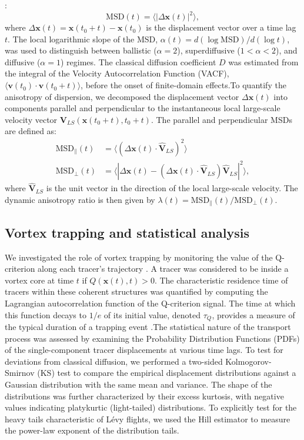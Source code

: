 \documentclass[]{article}
\begin{document}
\citep{katayama2025notetwopointmeansquare}:\begin{equation}\text{MSD}(t) = \langle |\Delta\mathbf{x}(t)|^2 \rangle,\end{equation}where $\Delta\mathbf{x}(t) = \mathbf{x}(t_0+t) - \mathbf{x}(t_0)$ is the displacement vector over a time lag $t$. The local logarithmic slope of the MSD, $\alpha(t) = d(\log \text{MSD}) / d(\log t)$, was used to distinguish between ballistic ($\alpha=2$), superdiffusive ($1 < \alpha < 2$), and diffusive ($\alpha=1$) regimes. The classical diffusion coefficient $D$ was estimated from the integral of the Velocity Autocorrelation Function (VACF), $\langle \mathbf{v}(t_0) \cdot \mathbf{v}(t_0+t) \rangle$, before the onset of finite-domain effects.To quantify the anisotropy of dispersion, we decomposed the displacement vector $\Delta\mathbf{x}(t)$ into components parallel and perpendicular to the instantaneous local large-scale velocity vector $\mathbf{V}_{LS}(\mathbf{x}(t_0+t), t_0+t)$. The parallel and perpendicular MSDs are defined as:\begin{align}\text{MSD}_{\parallel}(t) &= \langle (\Delta\mathbf{x}(t) \cdot \hat{\mathbf{V}}_{LS})^2 \rangle \\\text{MSD}_{\perp}(t) &= \langle |\Delta\mathbf{x}(t) - (\Delta\mathbf{x}(t) \cdot \hat{\mathbf{V}}_{LS}) \hat{\mathbf{V}}_{LS}|^2 \rangle,\end{align}where $\hat{\mathbf{V}}_{LS}$ is the unit vector in the direction of the local large-scale velocity. The dynamic anisotropy ratio is then given by $\lambda(t) = \text{MSD}_{\parallel}(t) / \text{MSD}_{\perp}(t)$.\subsection{Vortex trapping and statistical analysis}We investigated the role of vortex trapping by monitoring the value of the Q-criterion along each tracer's trajectory  \citep{bhatia2021numericalstudytrailingleading}. A tracer was considered to be inside a vortex core at time $t$ if $Q(\mathbf{x}(t), t) > 0$. The characteristic residence time of tracers within these coherent structures was quantified by computing the Lagrangian autocorrelation function of the Q-criterion signal. The time at which this function decays to $1/e$ of its initial value, denoted $\tau_Q$, provides a measure of the typical duration of a trapping event  \citep{kapoor2024trappingextremeclusteringfinitelydense}.The statistical nature of the transport process was assessed by examining the Probability Distribution Functions (PDFs) of the single-component tracer displacements at various time lags. To test for deviations from classical diffusion, we performed a two-sided Kolmogorov-Smirnov (KS) test to compare the empirical displacement distributions against a Gaussian distribution with the same mean and variance. The shape of the distributions was further characterized by their excess kurtosis, with negative values indicating platykurtic (light-tailed) distributions. To explicitly test for the heavy tails characteristic of Lévy flights, we used the Hill estimator to measure the power-law exponent of the distribution tails.
\end{document}
